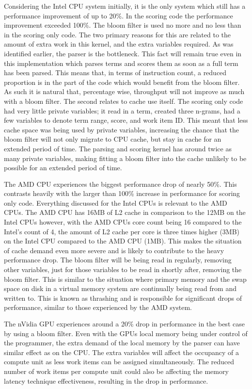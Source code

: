 Considering the Intel CPU system initially, it is the only system which still
has a performance improvement of up to 20\%. In the scoring code the performance
improvement exceeded 100\%. The bloom filter is used no more and no less than in
the scoring only code. The two primary reasons for this are related to the
amount of extra work in this kernel, and the extra variables required. As was
identified earlier, the parser is the bottleneck. This fact will remain true
even in this implementation which parses terms and scores them as soon as a full
term has been parsed. This means that, in terms of instruction count, a reduced
proportion is in the part of the code which would benefit from the bloom filter.
As such it is natural that, percentage wise, throughput will not improve as much
with a bloom filter. The second relates to cache use itself. The scoring only
code had very little private variables; it read in a term, created three
n-grams, had a few variables to denote term range, score, and work item ID. This
meant that less cache space was being used by private variables, increasing the
chance that the bloom filter will not only migrate to CPU cache, but stay in
cache for an extended period of time. The parsing and scoring kernel has around
twice as many private variables, making fitting a bloom filter into the cache
unlikely to be possible for an extended period of time.

The AMD CPU experiences the biggest performance drop of nearly 50\%. This
contrasts heavily with the larger than 100\% increase in performance for scoring
only code. Everything discussed for the Intel CPUs is relevant to the AMD CPUs.
The AMD CPU has 16MB of L2 cache in comparison to the 12MB on the Intel CPUs
however, with the AMD CPUs core count being 16 compared to the Intel's count of
4, the amount of L2 cache per core is three times higher (3MB) on the Intel CPU
compared to the AMD CPU (1MB). This makes the situation of cache demand even
more severe and is likely to contribute to the heavy performance drop. The bloom
filter will be being read in regularly, removing other variables, just for those
variables to be read in shortly after, removing the bloom filter. This is
similar to the situation where primary memory and the swap space on disk in a
virtual memory system are continually being read from and written to. This is
known as thrashing and is responsible for significant drops of performance,
similar to those experienced by the AMD system.

The nVidia GPU experiences around a 20\% drop in performance in the best case by
using a bloom filter. Even with the GPUs local memory being under control of the
programmer, the extra demand of the local memory by the parser can have similar
effect as on the CPU. The extra variables will affect the occupancy of a compute
unit as less work items can be assigned simultaneously. The reduced number of
work items per compute unit could also be affecting the memory latency technique
effectiveness, resulting in the drop in performance.

